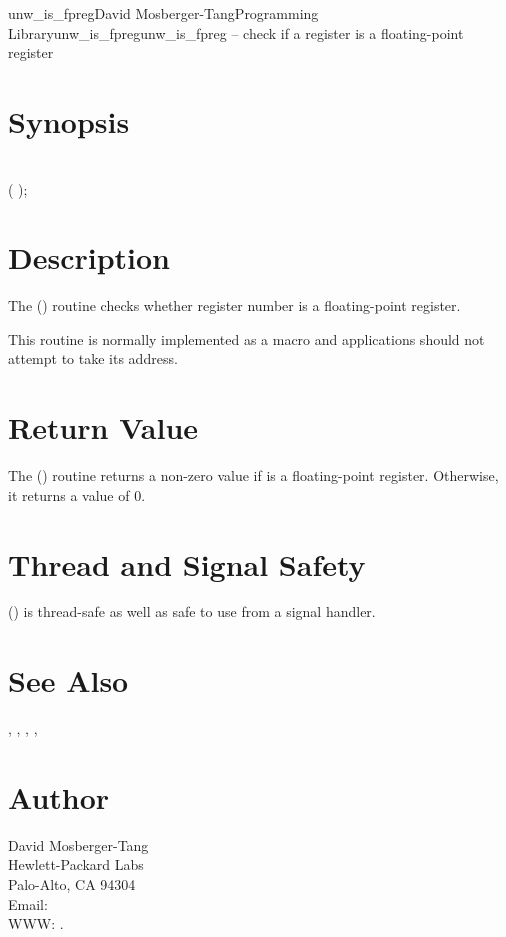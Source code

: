 \documentclass{article}
\begin{document}
\begin{Name}{3}{unw\_is\_fpreg}{David Mosberger-Tang}{Programming Library}{unw\_is\_fpreg}unw\_is\_fpreg -- check if a register is a floating-point register
\end{Name}

\section{Synopsis}

\\

 ( );\\

\section{Description}

The () routine checks whether register number
 is a floating-point register.

This routine is normally implemented as a macro and applications
should not attempt to take its address.

\section{Return Value}

The () routine returns a non-zero value if
 is a floating-point register.  Otherwise, it returns a value
of 0.

\section{Thread and Signal Safety}

() is thread-safe as well as safe to use
from a signal handler.

\section{See Also}

,
,
,
,

\section{Author}

\noindent
David Mosberger-Tang\\
Hewlett-Packard Labs\\
Palo-Alto, CA 94304\\
Email: \\
WWW: .
\LatexManEnd
\end{document}
